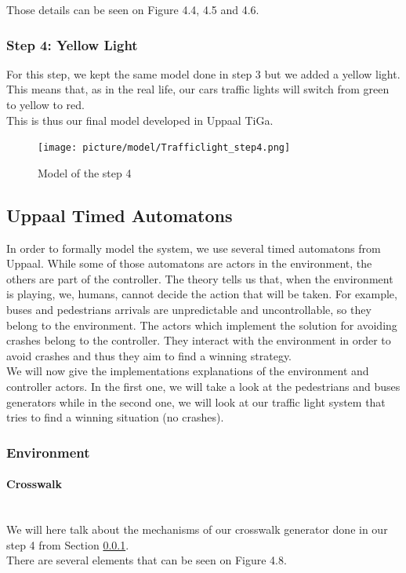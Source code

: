 Those details can be seen on Figure 4.4, 4.5 and 4.6.



\subsubsection{Step 4: Yellow Light}\label{sec:step4}
For this step, we kept the same model done in step 3 but we added a yellow light. This means that, as in the real life, our cars traffic lights will switch from green to yellow to red. \\
This is thus our final model developed in Uppaal TiGa.

\begin{figure}[H]\label{fig:step4}
  \centering
    \texttt{[image: picture/model/Trafficlight\_step4.png]}
    \caption{Model of the step 4}
\end{figure}

\subsection{Uppaal Timed Automatons}
In order to formally model the system, we use several timed automatons from Uppaal. While some of those automatons are actors in the environment, the others are part of the controller.
The theory tells us that, when the environment is playing, we, humans, cannot decide the action that will be taken. For example, buses and pedestrians arrivals are unpredictable and uncontrollable, so they belong to the environment.
The actors which implement the solution for avoiding crashes belong to the controller. They interact with the environment in order to avoid crashes and thus they aim to find a winning strategy. \\
We will now give the implementations explanations of the environment and controller actors. In the first one, we will take a look at the pedestrians and buses generators while in the second one, we will look at our traffic light system that tries to find a winning situation (no crashes).

\subsubsection{Environment}
\paragraph{Crosswalk} \mbox{}\\
We will here talk about the mechanisms of our crosswalk generator done in our step 4 from Section \ref{sec:step4}. \\
There are several elements that can be seen on Figure 4.8.

